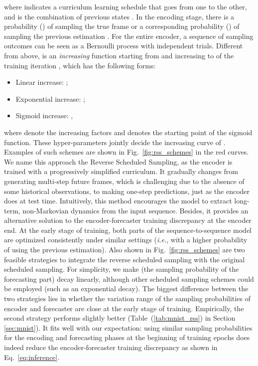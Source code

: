 \documentclass[10pt,journal,compsoc]{IEEEtran}
\newcommand{\eqn}[1]{Eq.~\eqref{#1}}
\newcommand{\tab}[1]{Table~(\ref{#1})}
\newcommand{\fig}[1]{Fig.~\ref{#1}}
\begin{document}
where  indicates a curriculum learning schedule that goes from one to the other, and  is the combination of previous states .
In the encoding stage, there is a probability () of sampling the true frame  or a corresponding probability () of sampling the previous estimation .
For the entire encoder, a sequence of sampling outcomes can be seen as a Bernoulli process with  independent trials. 
Different from above,  is an \textit{increasing} function starting from  and increasing to  of the training iteration , which has the following forms: 
\begin{itemize}
\item Linear increase: ;
\item Exponential increase: ;
\item Sigmoid increase: ,
\end{itemize}
where  denote the increasing factors and  denotes the starting point of the sigmoid function. These hyper-parameters jointly decide the increasing curve of .
Examples of such schemes are shown in \fig{fig:rss_schemes} in the red curves.
We name this approach the Reverse Scheduled Sampling, as the encoder is trained with a progressively simplified curriculum. It gradually changes from generating multi-step future frames, which is challenging due to the absence of some historical observations, to making one-step predictions, just as the encoder does at test time. 
Intuitively, this method encourages the model to extract long-term, non-Markovian dynamics from the input sequence. 
Besides, it provides an alternative solution to the encoder-forecaster training discrepancy at the encoder end. At the early stage of training, both parts of the sequence-to-sequence model are optimized consistently under similar settings (\textit{i.e.}, with a higher probability of using the previous estimation).
Also shown in \fig{fig:rss_schemes} are two feasible strategies to integrate the reverse scheduled sampling with the original scheduled sampling. 
For simplicity, we make  (the sampling probability of the forecasting part) decay linearly, although other scheduled sampling schemes could be employed (such as an exponential decay).
The biggest difference between the two strategies lies in whether the variation range of the sampling probabilities of encoder and forecaster are close at the early stage of training.
Empirically, the second strategy performs slightly better (\tab{tab:mnist_rss} in Section \ref{sec:mnist}).
It fits well with our expectation: using similar sampling probabilities for the encoding and forecasting phases at the beginning of training epochs does indeed reduce the encoder-forecaster training discrepancy as shown in \eqn{eq:inference}.
\end{document}
